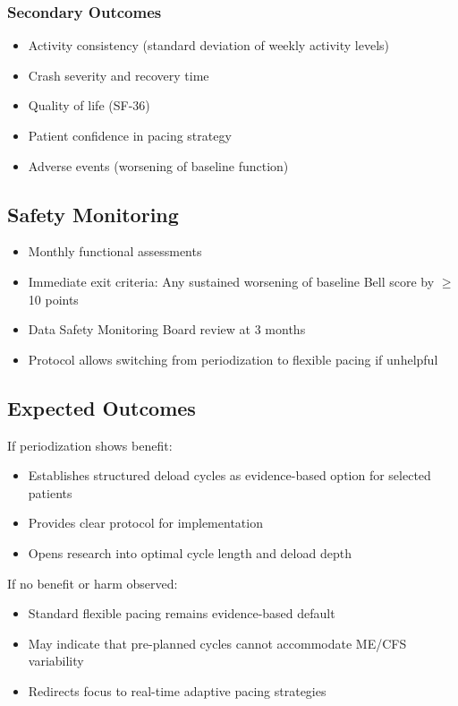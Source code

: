 \subsubsection{Secondary Outcomes}
\begin{itemize}
    \item Activity consistency (standard deviation of weekly activity levels)
    \item Crash severity and recovery time
    \item Quality of life (SF-36)
    \item Patient confidence in pacing strategy
    \item Adverse events (worsening of baseline function)
\end{itemize}

\subsection{Safety Monitoring}

\begin{itemize}
    \item Monthly functional assessments
    \item Immediate exit criteria: Any sustained worsening of baseline Bell score by $\geq$10 points
    \item Data Safety Monitoring Board review at 3 months
    \item Protocol allows switching from periodization to flexible pacing if unhelpful
\end{itemize}

\subsection{Expected Outcomes}

If periodization shows benefit:
\begin{itemize}
    \item Establishes structured deload cycles as evidence-based option for selected patients
    \item Provides clear protocol for implementation
    \item Opens research into optimal cycle length and deload depth
\end{itemize}

If no benefit or harm observed:
\begin{itemize}
    \item Standard flexible pacing remains evidence-based default
    \item May indicate that pre-planned cycles cannot accommodate ME/CFS variability
    \item Redirects focus to real-time adaptive pacing strategies
\end{itemize}

